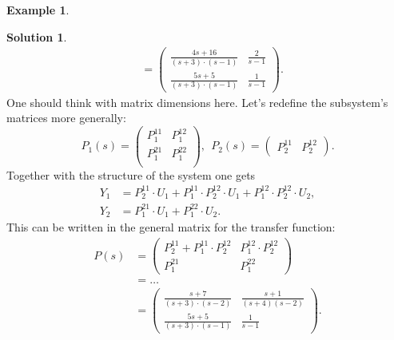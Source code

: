 \documentclass[a4paper,12 pt]{article}
\numberwithin{equation}{section}
\theoremstyle{definition}
\newtheorem{bsp}{Example}
\theoremstyle{remark}
\theoremstyle{definition}
\newtheorem*{lsg}{Solution}
\theoremstyle{definition}
\theoremstyle{definition}
\theoremstyle{remark}
\begin{document}
\begin{bsp}
\begin{lsg}
\begin{equation*}
\begin{split}
 &=\begin{pmatrix}
\frac{4s+16}{(s+3)\cdot (s-1)}&\frac{2}{s-1}\\[6pt]
\frac{5s+5}{(s+3)\cdot (s-1)}&\frac{1}{s-1}
\end{pmatrix}.
\end{split}
\end{equation*}
One should think with matrix dimensions here. Let's redefine the subsystem's matrices more generally:
\begin{equation*}
P_1(s)=\begin{pmatrix}
P_1^{11}&P_1^{12}\\
P_1^{21}&P_1^{22}\\
\end{pmatrix}, \ \ P_2(s)=\begin{pmatrix}
P_2^{11}&P_2^{12}
\end{pmatrix}.
\end{equation*}
Together with the structure of the system one gets
\begin{equation*}
\begin{split}
Y_1&=P_2^{11}\cdot U_1+P_1^{11}\cdot P_2^{12}\cdot U_1+P_1^{12}\cdot P_2^{12}\cdot U_2,\\
Y_2&=P_1^{21}\cdot U_1 +P_1^{22}\cdot U_2.
\end{split}
\end{equation*}
This can be written in the general matrix for the transfer function:
\begin{equation*}
\begin{split}
P(s)&=\begin{pmatrix}
P_2^{11}+P_1^{11}\cdot P_2^{12}&P_1^{12}\cdot P_2^{12} \\
P_1^{21}& P_1^{22}
\end{pmatrix}\\
&=\hdots \\
&= \begin{pmatrix}
 \frac{s+7}{(s+3)\cdot (s-2)}&\frac{s+1}{(s+4)(s-2)}\\[6pt]
 \frac{5s+5}{(s+3)\cdot (s-1)}&\frac{1}{s-1}
 \end{pmatrix}.
\end{split}
\end{equation*}

\end{lsg}




\end{bsp}
\newpage
\end{document}
